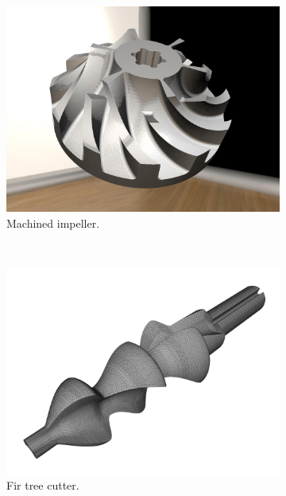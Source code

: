 \begin{figure}[h]
\begin{subfigure}[t]{0.32\textwidth}
			\includegraphics[width=\textwidth]{images/hq_impeller_complete}
			\caption{Machined impeller.}
			\label{fig:hq_impeller_complete}
		\end{subfigure}
		\\
		\begin{subfigure}[t]{0.32\textwidth}
			\centering
			\includegraphics[width=\textwidth]{images/turbine_tool}
			\caption{Fir tree cutter.}
			\label{fig:turbine_tool}
		\end{subfigure}
		\begin{subfigure}[t]{0.32\textwidth}
			\centering

\end{subfigure}
\end{figure}
